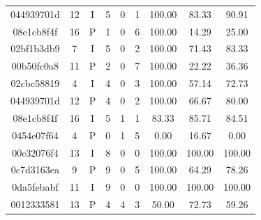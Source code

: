 \begin{table}[h]
\begin{tabular}{cc|c|ccc|ccc}
044939701d  & 12    & I     & 5     & 0     &   1   & 100.00    & 83.33     & 90.91 \\
08e1cb8f4f  & 16    & P     & 1     & 0     &   6   & 100.00    & 14.29     & 25.00 \\
02bf1b3db9  & 7     & I     & 5     & 0     &   2   & 100.00    & 71.43     & 83.33 \\
00b50fc0a8  & 11    & P     & 2     & 0     &   7   & 100.00    & 22.22     & 36.36 \\
02cbc58819  & 4     & I     & 4     & 0     &   3   & 100.00    & 57.14     & 72.73 \\
044939701d  & 12    & P     & 4     & 0     &   2   & 100.00    & 66.67     & 80.00 \\
08e1cb8f4f  & 16    & I     & 5     & 1     &   1   & 83.33     & 85.71     & 84.51 \\
0454e07f64  & 4     & P     & 0     & 1     &   5   & 0.00      & 16.67     & 0.00 \\
00c32076f4  & 13    & I     & 8     & 0     &   0   & 100.00    & 100.00    & 100.00 \\
0c7d3163ea  & 9     & P     & 9     & 0     &   5   & 100.00    & 64.29     & 78.26 \\
0da5febabf  & 11    & I     & 9     & 0     &   0   & 100.00    & 100.00    & 100.00 \\
0012333581  & 13    & P     & 4     & 4     &   3   & 50.00     & 72.73     & 59.26 \\
\end{tabular}
\end{table}
